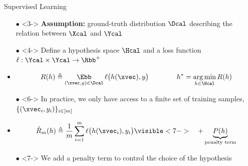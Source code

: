 \begin{frame}{Supervised Learning}
  \vspace{0.2cm}
  {\small
    \begin{itemize}
      \item[$\bullet$]<3-> \textbf{Assumption:} ground-truth distribution $\Dcal$ describing the relation between $\Xcal$ and $\Ycal$
      \item[$\bullet$]<4-> Define a hypothesis space $\Hcal$ and a loss function $\ell: \Ycal \times \Ycal \rightarrow \Rbb^{+}$
      \item<5->
      \vspace{-0.2cm}
      \begin{equation}
	R(h) \triangleq \E_{(\xvec, y) \in \Dcal} \ell \big( h(\xvec), y \big) \quad \quad \quad \quad h^* = \argmin_{h \in \Hcal} R(h)
      \end{equation}
      \item[$\bullet$]<6-> In practice, we only have access to a finite set of training samples, $\{(\xvec_i, y_i)\}_{i \in [m]}$
      \item<6->
      \vspace{-0.2cm}
      \begin{equation}
        \hat{R}_m(h) \triangleq \frac{1}{m} \sum_{i=1}^{m} \ell \big(h(\xvec_i), y_i \big)  \visible<7->{\quad + \underbrace{P(h)}_{\text{penalty term}}}
      \end{equation}
      \item[$\bullet$]<7-> We add a penalty term to control the choice of the hypothesis
    \end{itemize}
  }


\end{frame}







